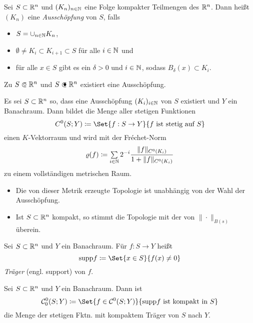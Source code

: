 \documentclass{cheat-sheet}
\newcommand{\supp}{\mathrm{supp}}
\begin{document}
\begin{defn}
  Sei $S \subset \mathbb{R}^n$ und $(K_n)_{n \in \mathbb{N}}$ eine Folge kompakter Teilmengen des $\mathbb{R}^n$. Dann heißt $(K_n)$ eine \emph{Ausschöpfung} von $S$, falls
  \begin{itemize}
    \item $S = \cup_{n \in \mathbb{N}} K_n$,
    \item $\emptyset \not= K_i \subset K_{i+1} \subset S$ für alle $i \in \mathbb{N}$ und
    \item für alle $x \in S$ gibt es ein $\delta > 0$ und $i \in \mathbb{N}$, sodass $B_\delta(x) \subset K_i$.
  \end{itemize}
\end{defn}

\begin{bem}
  Zu $S \opn \R^n$ und $S \cls \R^n$ existiert eine Ausschöpfung.
\end{bem}

\begin{defn}
  Es sei $S \subset \mathbb{R}^n$ so, dass eine Ausschöpfung $(K_i)_{i \in \mathbb{N}}$ von $S$ existiert und $Y$ ein Banachraum. Dann bildet die Menge aller stetigen Funktionen
  \[ C^0(S; Y) \coloneqq \Set{ f : S \to Y }{ f \text{ ist stetig auf } S } \]
  einen $K$-Vektorraum und wird mit der Fréchet-Norm
  \[ \varrho(f) \coloneqq \sum_{i \in \N} 2^{-i} \frac{ \| f \|_{C^0(K_i)} }{ 1 + \| f \|_{C^0(K_i)} } \]
  zu einem vollständigen metrischen Raum.
\end{defn}

\begin{bem}
  \begin{itemize}
    \item Die von dieser Metrik erzeugte Topologie ist unabhängig von der Wahl der Ausschöpfung.
    \item Ist $S \subset \mathbb{R}^n$ kompakt, so stimmt die Topologie mit der von $\| \cdot \|_{B(s)}$ überein.
  \end{itemize}
\end{bem}

\begin{defn}
  Sei $S \subset \mathbb{R}^n$ und $Y$ ein Banachraum. Für $f : S \to Y$ heißt
  \[ \supp f \coloneqq \Set{ x \in S }{ f(x) \not= 0 } \]
  \emph{Träger} (engl. support) von $f$.
\end{defn}

\begin{defn}
  Sei $S \subset \mathbb{R}^n$ und $Y$ ein Banachraum. Dann ist
  \[ \mathcal{C}_0^0(S; Y) \coloneqq \Set{ f \in \mathcal{C}^0(S; Y) }{ \supp f \text{ ist kompakt in } S } \]
  die Menge der stetigen Fktn. mit kompaktem Träger von $S$ nach $Y$.
\end{defn}
\end{document}
